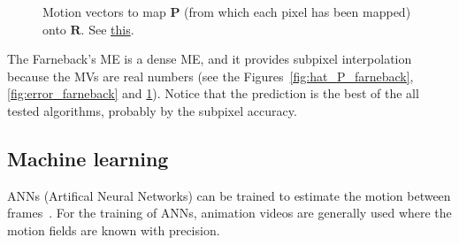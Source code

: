 \begin{figure}
  \centering
  \caption{Motion vectors to map ${\mathbf P}$ (from which each pixel has been mapped) onto ${\mathbf R}$. See \href{https://github.com/Sistemas-Multimedia/Sistemas-Multimedia.github.io/blob/master/milestones/09-ME/farneback_ME.ipynb}{this}.}
  \label{fig:MVs_farneback}
\end{figure}

The Farneback's ME is a dense ME, and it provides subpixel
interpolation because the MVs are real numbers (see the
Figures~\ref{fig:hat_P_farneback}, \ref{fig:error_farneback} and
\ref{fig:MVs_farneback}). Notice that the prediction is the best of
the all tested algorithms, probably by the subpixel accuracy.

\subsection{Machine learning}
ANNs (Artifical Neural Networks) can be trained to estimate the motion
between frames~\cite{dosovitskiy2015flownet}. For the training of
ANNs, animation videos are generally used where the motion fields are
known with precision.

\begin{comment}
\subsection{Motion compensation in action}
\begin{figure}
  \svg{R}{1000}
  \svg{P}{1000}
  \svg{y_motion}{1000}
  \svg{x_motion}{1000}
  \svg{hat_P}{1000}
  \svg{without_ME}{1000}
  \svg{with_ME}{1000}
  \caption{Effect of ME (using OF) over the temporal redundancy
    removal.}
  \label{fig:MC}
\end{figure}
The Fig.~\ref{fig:MC} shows an example the performace of the use of
OF, comparing the prediction error generated with and without ME. In
this experiment, a motion vector has been computed between each point
of ${\mathbf P}$ and ${\mathbf R}$. As it can be seen, the OF can
reduce the temporal redundancy significantly.
\end{comment}

